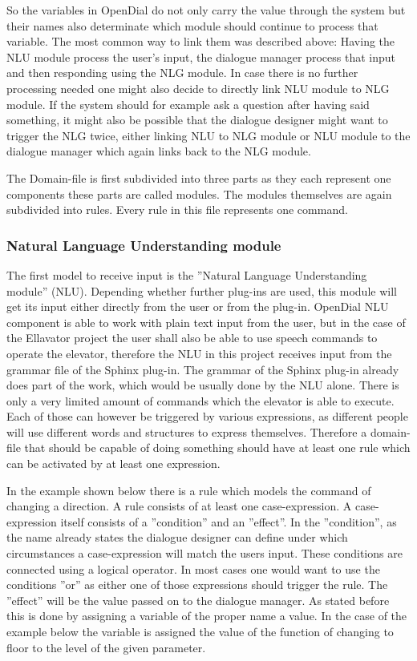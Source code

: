 \documentclass[a4paper, 12pt]{article}
\begin{document}
So the variables in OpenDial do not only carry the value through the system but their names also determinate which module should continue to process that variable.
The most common way to link them was described above: 
Having the NLU module process the user's input, the dialogue manager process that input and then responding using the NLG module.
In case there is no further processing needed one might also decide to directly link NLU module to NLG module. 
If the system should for example ask a question after having said something, it might also be possible that the dialogue designer might want to trigger the NLG twice, either linking NLU to NLG module or NLU module to the dialogue manager which again links back to the NLG module.


The Domain-file is first subdivided into three parts as they each represent one components these parts are called modules. 
The modules themselves are again subdivided into rules. Every rule in this file represents one command. 

\subsubsection{Natural Language Understanding module}

The first model to receive input is the ”Natural Language Understanding module” (NLU). 
Depending whether further plug-ins are used, this module will get its input either directly from the user or from the plug-in.
OpenDial NLU component is able to work with plain text input from the user, but in the case of the Ellavator project the user shall also be able to use speech commands to operate the elevator, therefore the NLU in this project receives input from the grammar file of the Sphinx plug-in.
The grammar of the Sphinx plug-in already does part of the work, which would be usually done by the NLU alone.
There is only a very limited amount of commands which the elevator is able to execute.
Each of those can however be triggered by various expressions, as different people will use different words and structures to express themselves.
Therefore a domain-file that should be capable of doing something should have at least one rule which can be activated by at least one expression. 


In the example shown below there is a rule which models the command of changing a direction.
A rule consists of at least one case-expression.
A case-expression itself consists of a ”condition” and an ”effect”.
 In the ”condition”, as the name already states the dialogue designer can define under which circumstances a case-expression will match the users input.
 These conditions are connected using a logical operator.
 In most cases one would want to use the conditions ”or” as either one of those expressions should trigger the rule.
 The ”effect” will be the value passed on to the dialogue manager.  
 As stated before this is done by assigning a variable of the proper name a value.
 In the case of the example below the variable is assigned the value of the function of changing to floor to the level of the given parameter. 
\end{document}
